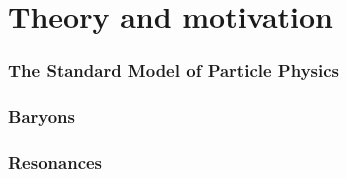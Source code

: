 \chapter{Theory and motivation}
\label{sec:Theory}

\subsection{The Standard Model of Particle Physics}

\subsection{Baryons}

\subsection{Resonances}
